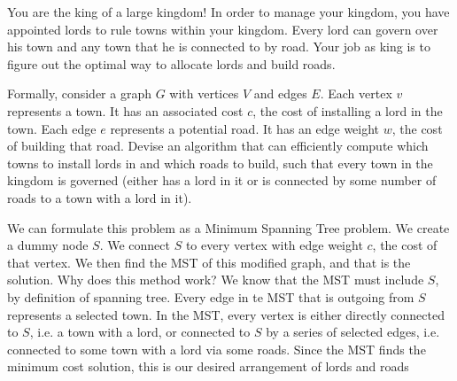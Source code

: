 \begin{blocksection}
\question You are the king of a large kingdom! In order to manage your kingdom, you have appointed lords to rule towns within your kingdom. Every lord can govern over his town and any town that he is connected to by road. Your job as king is to figure out the optimal way to allocate lords and build roads.

Formally, consider a graph $G$ with vertices $V$ and edges $E$. Each vertex $v$ represents a town. It has an associated cost $c$, the cost of installing a lord in the town. Each edge $e$ represents a potential road. It has an edge weight $w$, the cost of building that road. Devise an algorithm that can efficiently compute which towns to install lords in and which roads to build, such that every town in the kingdom is governed (either has a lord in it or is connected by some number of roads to a town with a lord in it).

\begin{solution}[1.5in]
  We can formulate this problem as a Minimum Spanning Tree problem. We create a dummy node $S$. We connect $S$ to every vertex with edge weight $c$, the cost of that vertex. We then find the MST of this modified graph, and that is the solution. Why does this method work? We know that the MST must include $S$, by definition of spanning tree. Every edge in te MST that is outgoing from $S$ represents a selected town. In the MST, every vertex is either directly connected to $S$, i.e. a town with a lord, or connected to $S$ by a series of selected edges, i.e. connected to some town with a lord via some roads. Since the MST finds the minimum cost solution, this is our desired arrangement of lords and roads
\end{solution}
\end{blocksection}
